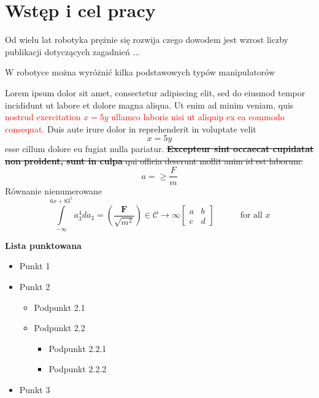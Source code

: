 \chapter{Wstęp i cel pracy}


\noindent Od wielu lat robotyka prężnie się rozwija czego dowodem jest wzrost liczby publikacji dotyczących zagadnień ...

W robotyce można wyróżnić kilka podstawowych typów manipulatorów


Lorem ipsum dolor sit amet, consectetur adipiscing elit, sed do eiusmod tempor incididunt ut labore et dolore magna aliqua. Ut enim ad minim veniam, quis \textcolor{red}{nostrud exercitation $x=5y$ ullamco laboris nisi ut aliquip ex ea commodo consequat.} Duis aute irure dolor in reprehenderit in voluptate velit $$x=5y$$ esse cillum dolore eu fugiat nulla pariatur. \sout{\textbf{Excepteur sint occaecat cupidatat non proident, sunt in culpa} qui officia deserunt mollit anim id est laborum.}
\begin{equation}
\label{eq:prawo_newtona}
a = \geq \frac{F}{m}   
\end{equation}
Równanie nienumerowane
\begin{equation*}
\label{eq:prawo_newtona2}
\int\limits_{-\infty}^{6x+83^5} a_3^4 da_3 = \left( \frac{\mathbf{F}}{\sqrt{m^2}}    \right) \in \mathcal{C} \to \infty \begin{bmatrix}a   & b \\ c   & d  \end{bmatrix} \quad \qquad \text{for all $x$}
\end{equation*}


\noindent \textbf{Lista punktowana}

\begin{itemize}
    \item Punkt 1
    \item Punkt 2
    \begin{itemize}
        \item Podpunkt 2.1
        \item Podpunkt 2.2
        \begin{itemize}
            \item Podpunkt 2.2.1
            \item Podpunkt 2.2.2
        \end{itemize}
    \end{itemize}
    \item Punkt 3
\end{itemize}

